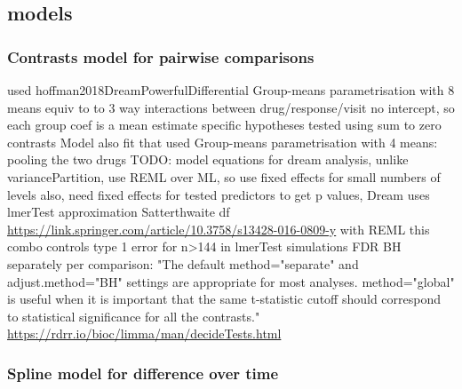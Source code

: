 \begin{outline}
\subsection{ models}

\subsubsection{Contrasts model for pairwise comparisons}

\1 used  hoffman2018DreamPowerfulDifferential
\1 Group-means parametrisation with 8 means
    \2 equiv to to 3 way interactions between drug/response/visit
    \2 no intercept, so each group coef is a mean estimate
\1 specific hypotheses tested using sum to zero contrasts 
\1 Model also fit that used Group-means parametrisation with 4 means: pooling the two drugs
\1 TODO: model equations
    \2 for dream analysis, unlike variancePartition, use REML over ML, so use fixed effects for small numbers of levels
    \2 also, need fixed effects for tested predictors
    \2 to get p values, Dream uses lmerTest approximation Satterthwaite df \url{https://link.springer.com/article/10.3758/s13428-016-0809-y} with REML
    \2 this combo controls type 1 error for n>144 in lmerTest simulations
    \2 FDR BH separately per comparison: "The default method="separate" and adjust.method="BH" settings are appropriate for most analyses. method="global" is useful when it is important that the same t-statistic cutoff should correspond to statistical significance for all the contrasts." \url{https://rdrr.io/bioc/limma/man/decideTests.html}

\subsubsection{Spline model for difference over time}


\end{outline}
